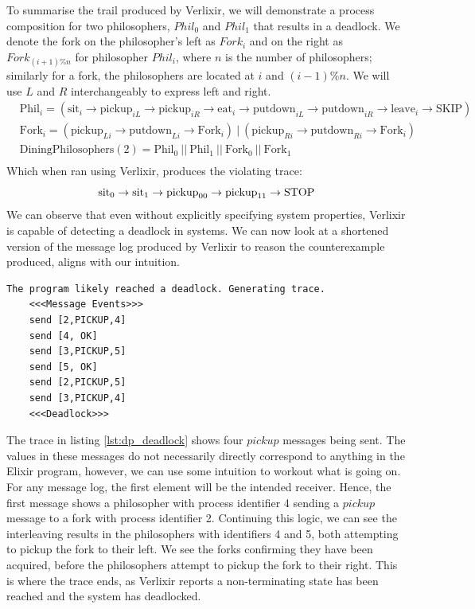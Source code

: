 To summarise the trail produced by Verlixir, we will demonstrate a process composition for two philosophers, $Phil_0$ and $Phil_1$ that results in a deadlock. We denote the fork on the philosopher's left as $Fork_{i}$ and on the right as $Fork_{(i+1)\%n}$ for philosopher $Phil_i$, where $n$ is the number of philosophers; similarly for a fork, the philosophers are located at $i$ and $(i-1)\%n$. We will use $L$ and $R$ interchangeably to express left and right. 
\[
\begin{aligned}
    & \text{Phil}_i = (\text{sit}_{i} \rightarrow \text{pickup}_{iL} \rightarrow \text{pickup}_{iR}\rightarrow \text{eat}_{i} \rightarrow \text{putdown}_{iL} \rightarrow \text{putdown}_{iR}\rightarrow \text{leave}_i \rightarrow \text{SKIP}) \\
    & \text{Fork}_i = (\text{pickup}_{Li} \rightarrow \text{putdown}_{Li} \rightarrow \text{Fork}_{i}) \ | \ (\text{pickup}_{Ri} \rightarrow \text{putdown}_{Ri} \rightarrow \text{Fork}_i) \\
    & \text{DiningPhilosophers}(2) = \text{Phil}_0 \ || \ \text{Phil}_1 \ || \ \text{Fork}_0 \ || \ \text{Fork}_1 \\
\end{aligned}
\]
Which when ran using Verlixir, produces the violating trace:
\[
    \text{sit}_0 \rightarrow \text{sit}_1 \rightarrow \text{pickup}_{00} \rightarrow \text{pickup}_{11} \rightarrow \text{STOP} \\
\]
We can observe that even without explicitly specifying system properties, Verlixir is capable of detecting a deadlock in systems. We can now look at a shortened version of the message log produced by Verlixir to reason the counterexample produced, aligns with our intuition.
\begin{lstlisting}[xleftmargin=.01\linewidth, xrightmargin=0.01\linewidth, caption={Message log produced by counterexample of a Dining Philosophers deadlock.}, label={lst:dp_deadlock}]
    The program likely reached a deadlock. Generating trace.
    <<<Message Events>>>
    send [2,PICKUP,4]
    send [4, OK]
    send [3,PICKUP,5]
    send [5, OK]
    send [2,PICKUP,5]
    send [3,PICKUP,4]
    <<<Deadlock>>>
\end{lstlisting}
The trace in listing \ref{lst:dp_deadlock} shows four $pickup$ messages being sent. The values in these messages do not necessarily directly correspond to anything in the Elixir program, however, we can use some intuition to workout what is going on. For any message log, the first element will be the intended receiver. Hence, the first message shows a philosopher with process identifier 4 sending a $pickup$ message to a fork with process identifier 2. Continuing this logic, we can see the interleaving results in the philosophers with identifiers 4 and 5, both attempting to pickup the fork to their left. We see the forks confirming they have been acquired, before the philosophers attempt to pickup the fork to their right. This is where the trace ends, as Verlixir reports a non-terminating state has been reached and the system has deadlocked.
